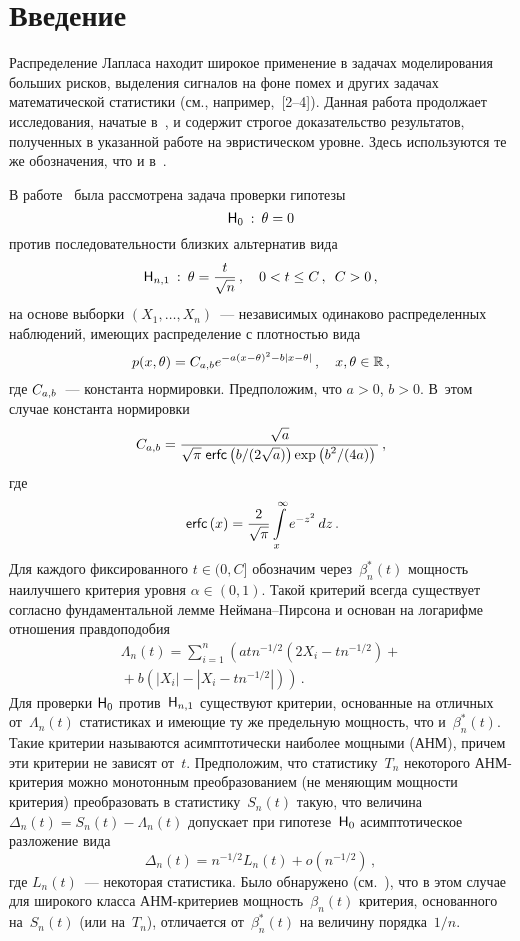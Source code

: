       \begin{multicols}{2}

      \label{st\stat}

\section{Введение}

Распределение Лапласа находит широкое применение в задачах
моделирования больших рисков, выделения сигналов на фоне помех и
других задачах математической статистики (см., например,~[2--4]). Данная работа продолжает
исследования, начатые в~\cite{article}, и содержит строгое
доказательство результатов, полученных в указанной работе на
эвристическом уровне. Здесь используются те же обозначения, что и в~\cite{article}.

В работе~\cite{article} была рассмотрена задача проверки гипотезы
$$
{\sf H}_0 \::\: \theta = 0
$$
против последовательности близких альтернатив вида
$$
{\sf H}_{n,1} \::\: \theta = \displaystyle\frac{\displaystyle t\mathstrut}{\displaystyle \sqrt{n}\mathstrut}\,, \quad 0 < t \leq C\,, \enskip C > 0\,,
$$
на основе выборки $(X_1, \dots, X_n)$~--- независимых одинаково распределенных наблюдений, 
имеющих распределение с плотностью вида
\begin{equation}
\label{l1}
p(x, \theta) = C_{a,b} e^{-a(x - \theta)^2- b|x - \theta|}\,,\quad x, \theta \in {\mathbb{R}}\,,
\end{equation}
где $C_{a,b}$~--- константа нормировки. Предположим, что $a>0$, $b>0$. В~этом случае константа нормировки 
$$
C_{a,b} = \displaystyle\frac{\displaystyle \sqrt{a}\mathstrut}{\displaystyle \sqrt{\pi}\;{\sf erfc}\left (b/(2\sqrt{a})\right )\exp \left(b^2/(4a)\right)\mathstrut}\,,
$$
где
$$
\:{\sf erfc}\left(x\right) = \displaystyle\frac{\displaystyle 2\mathstrut}{\displaystyle \sqrt{\pi}\mathstrut}\int\limits_x^{\infty} e^{-z^2}\,dz\,.
$$
Для каждого фиксированного $t\in(0,C]$ обозначим через~$\beta_n^*(t)$ мощность наилучшего критерия 
уровня $\alpha \in (0,1)$. Такой критерий всегда существует согласно фундаментальной лемме 
Неймана--Пир\-со\-на и основан на логарифме отношения правдоподобия
\begin{multline*}
\Lambda_n(t) = \sum_{i = 1}^n\left(atn^{-1/2}\left(2X_i - tn^{-1/2}\right) +{}\right.\\
\left.{}+ b\left(|X_i| - |X_i - tn^{-1/2}|\right)\right)\,.
\end{multline*}
Для проверки ${\sf H}_0$ против~${\sf H}_{n,1}$ существуют критерии, основанные на отличных от~$\Lambda_n(t)$ 
статистиках и имеющие ту же предельную мощность, что и~$\beta_n^*(t)$. Такие критерии называются 
асимптотически наиболее мощными (АНМ), причем эти критерии не зависят от~$t$. Предположим, что статистику~$T_n$ 
некоторого АНМ-кри\-те\-рия можно монотонным преобразованием (не меняющим мощности критерия) преобразовать в 
статистику~$S_n(t)$ такую, что величина $\Delta_n(t) = S_n(t) - 
\Lambda_n(t)$ допускает при гипотезе~${\sf H}_0$ асимптотическое разложение вида
\begin{equation}
\Delta_n(t) = n^{-1/2} L_n(t) +  o (n^{-1/2})\,,
\label{l3}
\end{equation}
где $L_n(t)$~--- некоторая статистика. Было обнаружено (см.~\cite{bening}), что в этом случае 
для широкого класса АНМ-кри\-те\-ри\-ев мощность~$\beta_n(t)$ критерия, основанного на~$S_n(t)$ (или на~$T_n$), 
отличается от~$\beta_n^*(t)$ на величину порядка~$1/n$.


\end{multicols}
